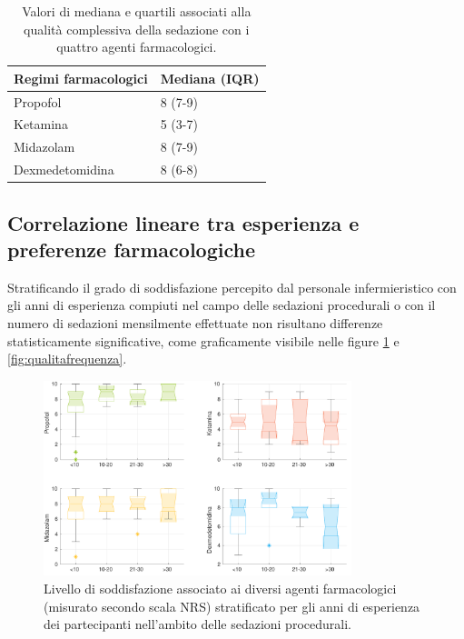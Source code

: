 \bgroup
\def\arraystretch{1.5}
\begin{table}[h]
    \centering
    \begin{tabular}{|l|l|}
         Regimi farmacologici & Mediana (IQR) \\ \hline
       Propofol & 8 (7-9)  \\
       Ketamina & 5 (3-7) \\
       Midazolam & 8 (7-9) \\
       Dexmedetomidina & 8 (6-8) 
    \end{tabular}
    \caption{Valori di mediana e quartili associati alla qualità complessiva della sedazione con i quattro agenti farmacologici.}
    \label{tab:qualitased}
\end{table}
\egroup


\subsection*{Correlazione lineare tra esperienza e preferenze farmacologiche}

Stratificando il grado di soddisfazione percepito dal personale infermieristico con gli anni di esperienza compiuti nel campo delle sedazioni procedurali o con il numero di sedazioni mensilmente effettuate non risultano differenze statisticamente significative, come graficamente visibile nelle figure \ref{fig:qualitaesperienza} e \ref {fig:qualitafrequenza}.

\begin{figure}[h]
    \centering
    \includegraphics[width=0.8\textwidth]{Figure/qualita-strat-esperienza.pdf}
    \caption{Livello di soddisfazione associato ai diversi agenti farmacologici (misurato secondo scala NRS) stratificato per gli anni di esperienza dei partecipanti nell'ambito delle sedazioni procedurali.}
    \label{fig:qualitaesperienza}
\end{figure}

